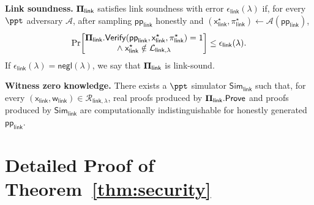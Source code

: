 \documentclass[conference,compsoc]{IEEEtran}
\newcommand{\para}{\textsf{pp}}
\newcommand{\bPi}{{\bf \Pi}}
\newcommand{\prove}{{\sf Prove}}
\renewcommand{\verify}{{\sf Verify}}
\newcommand{\relation}{{\mathcal{R}}}
\newcommand{\stmt}{\mathsf{x}}      %
\newcommand{\wit}{\mathsf{w}}       %
\theoremstyle{plain}
\theoremstyle{definition}
\theoremstyle{remark}
\begin{document}
\noindent\textbf{Link soundness.}
\(\bPi_{\mathsf{link}}\) satisfies link soundness with error
\(\epsilon_{\mathsf{link}}(\lambda)\) if, for every \(\ppt\) adversary
\(\mathcal{A}\), after sampling \(\para_{\mathsf{link}}\) honestly and
\((\stmt_{\mathsf{link}}^\star,\pi_{\mathsf{link}}^\star)
\gets\mathcal A(\para_{\mathsf{link}})\),
\[
\Pr\!\left[
\begin{gathered}
  \bPi_{\mathsf{link}}.\verify(
    \para_{\mathsf{link}},\stmt_{\mathsf{link}}^\star,
    \pi_{\mathsf{link}}^\star)=1\\[-1mm]
  \wedge\;
  \stmt_{\mathsf{link}}^\star\notin\mathcal{L}_{\mathsf{link},\lambda}
\end{gathered}
\right]
\le \epsilon_{\mathsf{link}}(\lambda).
\]
If \(\epsilon_{\mathsf{link}}(\lambda)=\textsf{negl}(\lambda)\), we say that
\(\bPi_{\mathsf{link}}\) is link-sound.

\noindent\textbf{Witness zero knowledge.}
There exists a \(\ppt\) simulator \(\mathsf{Sim}_{\mathsf{link}}\) such that,
for every
\((\stmt_{\mathsf{link}},\wit_{\mathsf{link}})
\in\relation_{\mathsf{link},\lambda}\), real proofs produced by
\(\bPi_{\mathsf{link}}.\prove\) and proofs produced by
\(\mathsf{Sim}_{\mathsf{link}}\) are computationally indistinguishable for
honestly generated \(\para_{\mathsf{link}}\).

\section{Detailed Proof of Theorem~\ref{thm:security}}
\label{app:security-proof}
\end{document}
